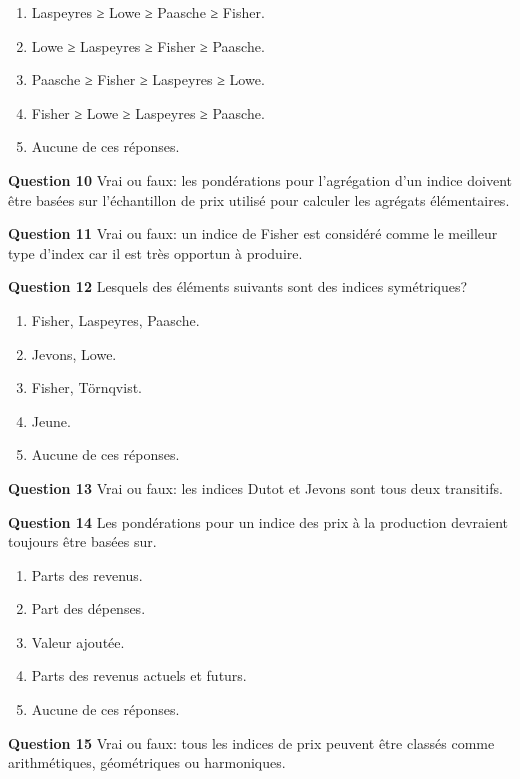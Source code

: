\documentclass[]{article}
\begin{document}
\begin{enumerate}
\def\labelenumi{\alph{enumi})}
\item
  Laspeyres ≥ Lowe ≥ Paasche ≥ Fisher.
\item
  Lowe ≥ Laspeyres ≥ Fisher ≥ Paasche.
\item
  Paasche ≥ Fisher ≥ Laspeyres ≥ Lowe.
\item
  Fisher ≥ Lowe ≥ Laspeyres ≥ Paasche.
\item
  Aucune de ces réponses.
\end{enumerate}

\textbf{Question 10} Vrai ou faux: les pondérations pour l'agrégation d'un indice doivent être basées sur l'échantillon de prix utilisé pour calculer les agrégats élémentaires.

\textbf{Question 11} Vrai ou faux: un indice de Fisher est considéré comme le meilleur type d'index car il est très opportun à produire.

\textbf{Question 12} Lesquels des éléments suivants sont des indices symétriques?

\begin{enumerate}
\def\labelenumi{\alph{enumi})}
\item
  Fisher, Laspeyres, Paasche.
\item
  Jevons, Lowe.
\item
  Fisher, Törnqvist.
\item
  Jeune.
\item
  Aucune de ces réponses.
\end{enumerate}

\textbf{Question 13} Vrai ou faux: les indices Dutot et Jevons sont tous deux transitifs.

\textbf{Question 14} Les pondérations pour un indice des prix à la production devraient toujours être basées sur.

\begin{enumerate}
\def\labelenumi{\alph{enumi})}
\item
  Parts des revenus.
\item
  Part des dépenses.
\item
  Valeur ajoutée.
\item
  Parts des revenus actuels et futurs.
\item
  Aucune de ces réponses.
\end{enumerate}

\textbf{Question 15} Vrai ou faux: tous les indices de prix peuvent être classés comme arithmétiques, géométriques ou harmoniques.
\end{document}
